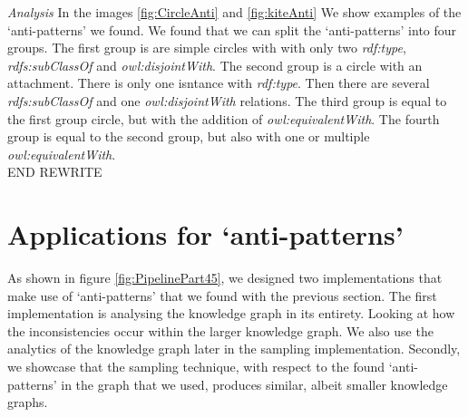 \documentclass[11pt,letterpaper ,oneside ]{book}
\begin{document}
	\textit{Analysis} In the images \ref{fig:CircleAnti} and \ref{fig:kiteAnti} We show examples of the `anti-patterns' we found. We found that we can split the `anti-patterns' into four groups. The first group is are simple circles with with only two \textit{rdf:type}, \textit{rdfs:subClassOf} and \textit{owl:disjointWith}. The second group is a circle with an attachment. There is only one isntance with \textit{rdf:type}. Then there are several \textit{rdfs:subClassOf} and one \textit{owl:disjointWith} relations. The third group is equal to the first group circle, but with the addition of \textit{owl:equivalentWith}. The fourth group is equal to the second group, but also with one or multiple \textit{owl:equivalentWith}. \\
	END REWRITE
	\newpage
	
	\chapter{Applications for `anti-patterns'}\label{Implementation}
	As shown in figure \ref{fig:PipelinePart45}, we designed two implementations that make use of `anti-patterns' that we found with the previous section. The first implementation is analysing the knowledge graph in its entirety. Looking at how the inconsistencies occur within the larger knowledge graph. We also use the analytics of the knowledge graph later in the sampling implementation. Secondly, we showcase that the sampling technique, with respect to the found `anti-patterns' in the graph that we used, produces similar, albeit smaller knowledge graphs.
	
\end{document}
